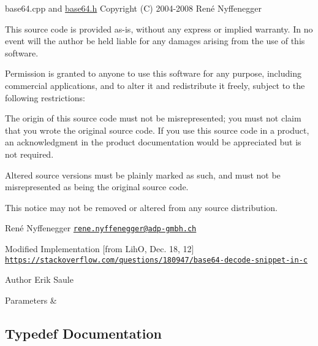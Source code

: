 base64.\+cpp and \hyperlink{base64_8h}{base64.\+h} Copyright (C) 2004-\/2008 René Nyffenegger

This source code is provided \textquotesingle{}as-\/is\textquotesingle{}, without any express or implied warranty. In no event will the author be held liable for any damages arising from the use of this software.

Permission is granted to anyone to use this software for any purpose, including commercial applications, and to alter it and redistribute it freely, subject to the following restrictions\+:


\begin{DoxyEnumerate}
\item The origin of this source code must not be misrepresented; you must not claim that you wrote the original source code. If you use this source code in a product, an acknowledgment in the product documentation would be appreciated but is not required.
\begin{DoxyEnumerate}
\item Altered source versions must be plainly marked as such, and must not be misrepresented as being the original source code.
\item This notice may not be removed or altered from any source distribution.
\end{DoxyEnumerate}

René Nyffenegger \href{mailto:rene.nyffenegger@adp-gmbh.ch}{\tt rene.\+nyffenegger@adp-\/gmbh.\+ch}

Modified Implementation \mbox{[}from LihO, Dec. 18, 12\mbox{]} \href{https://stackoverflow.com/questions/180947/base64-decode-snippet-in-c}{\tt https\+://stackoverflow.\+com/questions/180947/base64-\/decode-\/snippet-\/in-\/c}
\end{DoxyEnumerate}

\begin{DoxyAuthor}{Author}
Erik Saule 
\end{DoxyAuthor}

\begin{DoxyParams}{Parameters}
{\em } & \\
\hline
\end{DoxyParams}


\subsection{Typedef Documentation}
\mbox{\label{namespacebridges_a59b77ee45243ba85c701fb8ab298ef00}} 
